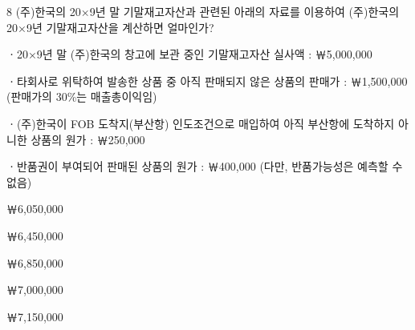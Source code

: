 \begin{question}{8}
(주)한국의 20×9년 말 기말재고자산과 관련된 아래의 자료를 이용하여 (주)한국의 20×9년 기말재고자산을 계산하면 얼마인가?
\begin{framedtext}
ㆍ20×9년 말 (주)한국의 창고에 보관 중인 기말재고자산 실사액 : ￦5,000,000 \par
ㆍ타회사로 위탁하여 발송한 상품 중 아직 판매되지 않은 상품의 판매가 : ￦1,500,000 (판매가의 30\%는 매출총이익임) \par
ㆍ(주)한국이 FOB 도착지(부산항) 인도조건으로 매입하여 아직 부산항에 도착하지 아니한 상품의 원가 : ￦250,000 \par
ㆍ반품권이 부여되어 판매된 상품의 원가 : ￦400,000 (다만, 반품가능성은 예측할 수 없음) \par
\end{framedtext}
\begin{choices}
  \item ￦6,050,000
  \item ￦6,450,000
  \item ￦6,850,000
  \item ￦7,000,000
  \item ￦7,150,000
\end{choices}
\end{question}
